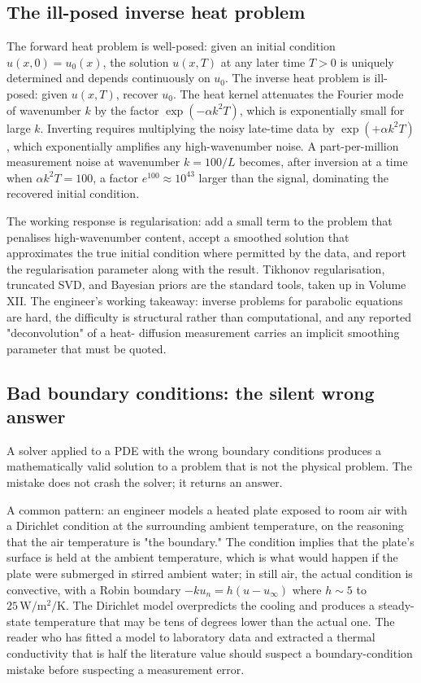 \subsection{The ill-posed inverse heat problem}

The forward heat problem is well-posed: given an initial condition
$u(x, 0) = u_{0}(x)$, the solution $u(x, T)$ at any later time
$T > 0$ is uniquely determined and depends continuously on
$u_{0}$. The inverse heat problem is ill-posed: given $u(x, T)$,
recover $u_{0}$. The heat kernel attenuates the Fourier mode of
wavenumber $k$ by the factor $\exp(-\alpha k^{2} T)$, which is
exponentially small for large $k$. Inverting requires multiplying
the noisy late-time data by $\exp(+\alpha k^{2} T)$, which
exponentially amplifies any high-wavenumber noise. A part-per-million
measurement noise at wavenumber $k = 100/L$ becomes, after
inversion at a time when $\alpha k^{2} T = 100$, a factor $e^{100}
\approx 10^{43}$ larger than the signal, dominating the recovered
initial condition.

The working response is regularisation: add a small term to the
problem that penalises high-wavenumber content, accept a smoothed
solution that approximates the true initial condition where
permitted by the data, and report the regularisation parameter
along with the result. Tikhonov regularisation, truncated SVD,
and Bayesian priors are the standard tools, taken up in Volume
XII. The engineer's working takeaway: inverse problems for
parabolic equations are hard, the difficulty is structural rather
than computational, and any reported "deconvolution" of a heat-
diffusion measurement carries an implicit smoothing parameter
that must be quoted.

\subsection{Bad boundary conditions: the silent wrong answer}

A solver applied to a PDE with the wrong boundary conditions
produces a mathematically valid solution to a problem that is not
the physical problem. The mistake does not crash the solver; it
returns an answer.

A common pattern: an engineer models a heated plate exposed to
room air with a Dirichlet condition at the surrounding ambient
temperature, on the reasoning that the air temperature is
"the boundary." The condition implies that the plate's surface is
held at the ambient temperature, which is what would happen if
the plate were submerged in stirred ambient water; in still air,
the actual condition is convective, with a Robin boundary
$-k u_{n} = h(u - u_{\infty})$ where $h \sim 5$ to $25\,\si{\watt
\per\meter\squared\per\kelvin}$. The Dirichlet model overpredicts
the cooling and produces a steady-state temperature that may be
tens of degrees lower than the actual one. The reader who has
fitted a model to laboratory data and extracted a thermal
conductivity that is half the literature value should suspect a
boundary-condition mistake before suspecting a measurement error.

